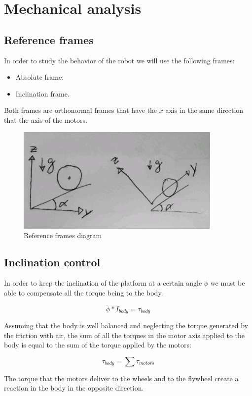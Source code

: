 \section{Mechanical analysis}
\subsection{Reference frames}
In order to study the behavior of the robot we will use the following frames:
\begin{itemize}
    \item Absolute frame. 
    \item Inclination frame.
\end{itemize}
Both frames are orthonormal frames that have the $x$ axis in the same direction that the axis of the motors.

\begin{figure}[ht]
	\centering
	\includegraphics[width=10cm]{img/reference_frames.jpg}
	\caption{Reference frames diagram}
	\label{fig:Reference frames diagram}
\end{figure}


\subsection{Inclination control}
In order to keep the inclination of the platform at a certain angle $\phi$ we must be able to compensate all the torque being to the body.

\[\ddot{\phi} * I_{body} = \tau_{body} \]

Assuming that the body is well balanced and neglecting the torque generated by the friction with air, the sum of all the torques in the motor axis applied to the body is equal to the sum of the torque applied by the motors:

\[\tau_{body} = \sum \tau_{motors}\]

The torque that the motors deliver to the wheels and to the flywheel create a reaction in the body in the opposite direction.


